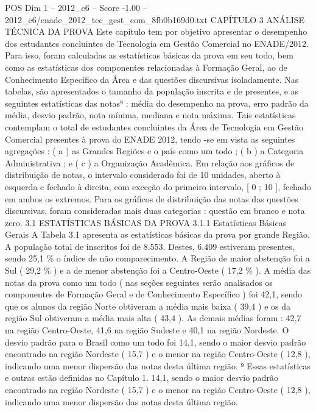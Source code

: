 \begin{textsample}{POS Dim 1 – 2012\_c6 – Score -1.00 – 2012\_c6/enade\_2012\_tec\_gest\_com\_8fb0b169d0.txt}  \label{ex:f1_pos_187}
CAPÍTULO 3 ANÁLISE TÉCNICA DA PROVA Este capítulo tem por objetivo apresentar o desempenho dos estudantes concluintes de Tecnologia em Gestão Comercial no ENADE/2012.
Para isso, foram calculadas as estatísticas básicas da prova em seu todo, bem como as estatísticas dos componentes relacionadas à Formação Geral, ao de Conhecimento Específico da Área e das questões discursivas isoladamente.
Nas tabelas, são apresentados o tamanho da população inscrita e de presentes, e as seguintes estatísticas das notas⁹ : média do desempenho na prova, erro padrão da média, desvio padrão, nota mínima, mediana e nota máxima.
Tais estatísticas contemplam o total de estudantes concluintes da Área de Tecnologia em Gestão Comercial presentes à prova do ENADE 2012, tendo -se em vista as seguintes agregações : ( a ) as Grandes Regiões e o país como um todo ; ( b ) a Categoria Administrativa ; e ( c ) a Organização Acadêmica.
Em relação aos gráficos de distribuição de notas, o intervalo considerado foi de 10 unidades, aberto à esquerda e fechado à direita, com exceção do primeiro intervalo, [ 0 ; 10 ], fechado em ambos os extremos.
Para os gráficos de distribuição das notas das questões discursivas, foram consideradas mais duas categorias : questão em branco e nota zero. 3.1 ESTATÍSTICAS BÁSICAS DA PROVA 3.1.1 Estatísticas Básicas Gerais A Tabela 3.1 apresenta as estatísticas básicas da prova por grande Região.
A população total de inscritos foi de 8.553.
Destes, 6.409 estiveram presentes, sendo 25,1 \% o índice de não comparecimento.
A Região de maior abstenção foi a Sul ( 29,2 \% ) e a de menor abstenção foi a Centro-Oeste ( 17,2 \% ).
A média das notas da prova como um todo ( nas seções seguintes serão analisados os componentes de Formação Geral e de Conhecimento Específico ) foi 42,1, sendo que os alunos da região Norte obtiveram a média mais baixa ( 39,4 ) e os da região Sul obtiveram a média mais alta ( 43,4 ).
As demais médias foram : 42,7 na região Centro-Oeste, 41,6 na região Sudeste e 40,1 na região Nordeste.
O desvio padrão para o Brasil como um todo foi 14,1, sendo o maior desvio padrão encontrado na região Nordeste ( 15,7 ) e o menor na região Centro-Oeste ( 12,8 ), indicando uma menor dispersão das notas desta última região. ⁹ Essas estatísticas e outras estão definidas no Capítulo 1. 14,1, sendo o maior desvio padrão encontrado na região Nordeste ( 15,7 ) e o menor na região Centro-Oeste ( 12,8 ), indicando uma menor dispersão das notas desta última região.

\end{textsample}
